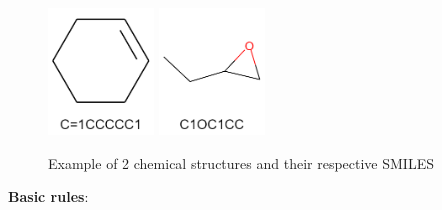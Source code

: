         \begin{figure}[htb]
        \centering
        \includegraphics[width=0.25\textwidth]{figures/Smiles-Smile1.png}
        \includegraphics[width=0.25\textwidth]{figures/Smiles-Smile2.png}
        \caption{Example of 2 chemical structures and their respective SMILES}
        \label{fig:smile-examples}
    \end{figure}

    {\bf Basic rules}: 
    
